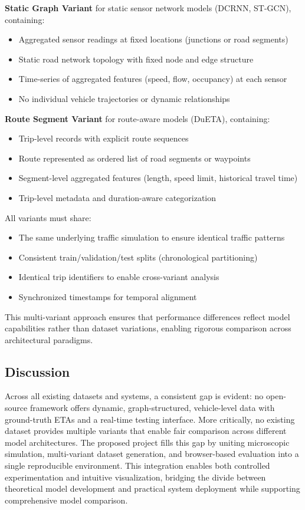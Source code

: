 \textbf{Static Graph Variant} for static sensor network models (DCRNN, ST-GCN), containing:
\begin{itemize}
    \item Aggregated sensor readings at fixed locations (junctions or road segments)
    \item Static road network topology with fixed node and edge structure
    \item Time-series of aggregated features (speed, flow, occupancy) at each sensor
    \item No individual vehicle trajectories or dynamic relationships
\end{itemize}

\textbf{Route Segment Variant} for route-aware models (DuETA), containing:
\begin{itemize}
    \item Trip-level records with explicit route sequences
    \item Route represented as ordered list of road segments or waypoints
    \item Segment-level aggregated features (length, speed limit, historical travel time)
    \item Trip-level metadata and duration-aware categorization
\end{itemize}

All variants must share:
\begin{itemize}
    \item The same underlying traffic simulation to ensure identical traffic patterns
    \item Consistent train/validation/test splits (chronological partitioning)
    \item Identical trip identifiers to enable cross-variant analysis
    \item Synchronized timestamps for temporal alignment
\end{itemize}

This multi-variant approach ensures that performance differences reflect model capabilities rather than dataset variations, enabling rigorous comparison across architectural paradigms.

\subsection{Discussion}

Across all existing datasets and systems, a consistent gap is evident: no open-source framework offers dynamic, graph-structured, vehicle-level data with ground-truth ETAs and a real-time testing interface. More critically, no existing dataset provides multiple variants that enable fair comparison across different model architectures. The proposed project fills this gap by uniting microscopic simulation, multi-variant dataset generation, and browser-based evaluation into a single reproducible environment. This integration enables both controlled experimentation and intuitive visualization, bridging the divide between theoretical model development and practical system deployment while supporting comprehensive model comparison.
